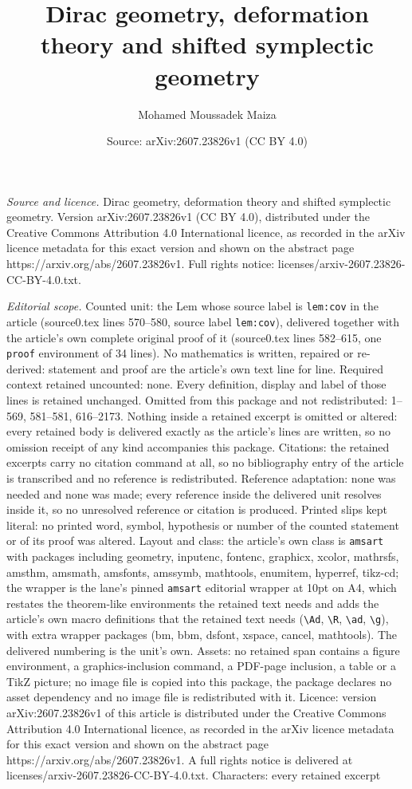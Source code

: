 \documentclass[10pt,a4paper]{amsart}
\title[Dirac geometry, deformation theory and shifted symplectic ge]{Dirac geometry, deformation theory and shifted symplectic geometry}
\author{Mohamed Moussadek Maiza}
\date{Source: arXiv:2607.23826v1 (CC BY 4.0)}
\begin{document}
\maketitle

\noindent\emph{Source and licence.} Dirac geometry, deformation theory and shifted symplectic geometry. Version arXiv:2607.23826v1 (CC BY 4.0), distributed under the Creative Commons Attribution 4.0 International licence, as recorded in the arXiv licence metadata for this exact version and shown on the abstract page https://arxiv.org/abs/2607.23826v1. Full rights notice: licenses/arxiv-2607.23826-CC-BY-4.0.txt.\par\smallskip

\noindent\textit{Editorial scope.} Counted unit: the Lem whose source label is \texttt{lem:cov} in the article (source0.tex lines 570--580, source label \texttt{lem:cov}), delivered together with the article's own complete original proof of it (source0.tex lines 582--615, one \texttt{proof} environment of 34 lines). No mathematics is written, repaired or re-derived: statement and proof are the article's own text line for line. Required context retained uncounted: none. Every definition, display and label of those lines is retained unchanged. Omitted from this package and not redistributed: 1--569, 581--581, 616--2173. Nothing inside a retained excerpt is omitted or altered: every retained body is delivered exactly as the article's lines are written, so no omission receipt of any kind accompanies this package. Citations: the retained excerpts carry no citation command at all, so no bibliography entry of the article is transcribed and no reference is redistributed. Reference adaptation: none was needed and none was made; every reference inside the delivered unit resolves inside it, so no unresolved reference or citation is produced. Printed slips kept literal: no printed word, symbol, hypothesis or number of the counted statement or of its proof was altered. Layout and class: the article's own class is \texttt{amsart} with packages including geometry, inputenc, fontenc, graphicx, xcolor, mathrsfs, amsthm, amsmath, amsfonts, amssymb, mathtools, enumitem, hyperref, tikz-cd; the wrapper is the lane's pinned \texttt{amsart} editorial wrapper at 10pt on A4, which restates the theorem-like environments the retained text needs and adds the article's own macro definitions that the retained text needs (\texttt{\textbackslash Ad}, \texttt{\textbackslash R}, \texttt{\textbackslash ad}, \texttt{\textbackslash g}), with extra wrapper packages (bm, bbm, dsfont, xspace, cancel, mathtools). The delivered numbering is the unit's own. Assets: no retained span contains a figure environment, a graphics-inclusion command, a PDF-page inclusion, a table or a TikZ picture; no image file is copied into this package, the package declares no asset dependency and no image file is redistributed with it. Licence: version arXiv:2607.23826v1 of this article is distributed under the Creative Commons Attribution 4.0 International licence, as recorded in the arXiv licence metadata for this exact version and shown on the abstract page https://arxiv.org/abs/2607.23826v1. A full rights notice is delivered at licenses/arxiv-2607.23826-CC-BY-4.0.txt. Characters: every retained excerpt 
\end{document}
